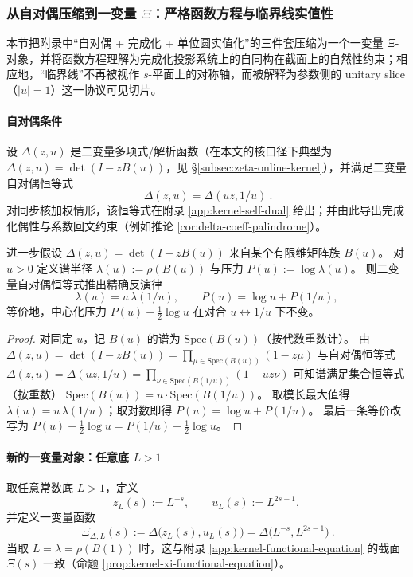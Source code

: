 \subsubsection{从自对偶压缩到一变量 \texorpdfstring{$\Xi$}{Xi}：严格函数方程与临界线实值性}\label{subsec:xi-from-self-dual}
本节把附录中“自对偶 + 完成化 + 单位圆实值化”的三件套压缩为一个一变量 \(\Xi\)-对象，并将函数方程理解为完成化投影系统上的自同构在截面上的自然性约束；相应地，“临界线”不再被视作 \(s\)-平面上的对称轴，而被解释为参数侧的 unitary slice（\(|u|=1\)）这一协议可见切片。

\paragraph{自对偶条件}
设 \(\Delta(z,u)\) 是二变量多项式/解析函数（在本文的核口径下典型为
\(\Delta(z,u)=\det(I-zB(u))\)，见 \S\ref{subsec:zeta-online-kernel}），并满足二变量自对偶恒等式
\[
\boxed{\ \Delta(z,u)=\Delta(uz,1/u)\ }.
\]
对同步核加权情形，该恒等式在附录 \ref{app:kernel-self-dual} 给出；并由此导出完成化偶性与系数回文约束（例如推论 \ref{cor:delta-coeff-palindrome}）。

\begin{corollary}\label{cor:xi-selfdual-pressure-inversion}
进一步假设 \(\Delta(z,u)=\det(I-zB(u))\) 来自某个有限维矩阵族 \(B(u)\)。
对 \(u>0\) 定义谱半径 \(\lambda(u):=\rho(B(u))\) 与压力 \(P(u):=\log\lambda(u)\)。
则二变量自对偶恒等式推出精确反演律
\[
\lambda(u)=u\,\lambda(1/u),
\qquad
P(u)=\log u+P(1/u),
\]
等价地，中心化压力 \(P(u)-\tfrac12\log u\) 在对合 \(u\leftrightarrow 1/u\) 下不变。
\end{corollary}
\begin{proof}
对固定 \(u\)，记 \(B(u)\) 的谱为 \(\mathrm{Spec}(B(u))\)（按代数重数计）。
由 \(\Delta(z,u)=\det(I-zB(u))=\prod_{\mu\in\mathrm{Spec}(B(u))}(1-z\mu)\) 与自对偶恒等式
\(\Delta(z,u)=\Delta(uz,1/u)=\prod_{\nu\in\mathrm{Spec}(B(1/u))}(1-uz\nu)\)
可知谱满足集合恒等式（按重数）
\(
\mathrm{Spec}(B(u))=u\cdot \mathrm{Spec}(B(1/u))
\)。
取模长最大值得 \(\lambda(u)=u\,\lambda(1/u)\)；取对数即得 \(P(u)=\log u+P(1/u)\)。
最后一条等价改写为
\(
P(u)-\tfrac12\log u=P(1/u)+\tfrac12\log u
\)。
\end{proof}

\paragraph{新的一变量对象：任意底 \texorpdfstring{$L>1$}{L>1}}
取任意常数底 \(L>1\)，定义
\[
z_L(s):=L^{-s},\qquad u_L(s):=L^{2s-1},
\]
并定义一变量函数
\[
\boxed{\ \Xi_{\Delta,L}(s):=\Delta\!\bigl(z_L(s),u_L(s)\bigr)=\Delta\!\bigl(L^{-s},L^{2s-1}\bigr)\ }.
\]
当取 \(L=\lambda=\rho(B(1))\) 时，这与附录 \ref{app:kernel-functional-equation} 的截面 \(\Xi(s)\) 一致（命题 \ref{prop:kernel-xi-functional-equation}）。

